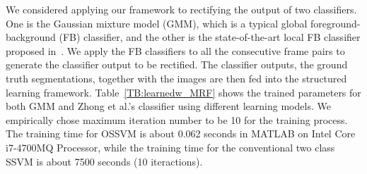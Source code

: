 \documentclass[10pt,journal,compsoc]{newIEEEtran}
\begin{document}
We considered applying our framework to rectifying the output of two classifiers. One is the Gaussian mixture model (GMM), which is a typical global foreground-background (FB) classifier, and the other is the state-of-the-art local FB classifier proposed in~\cite{Zhong2012UDC_SIGGRAPHAsia}. We apply the FB classifiers to all the consecutive frame pairs to generate the classifier output to be rectified. The classifier outputs, the ground truth segmentations, together with the images are then fed into the structured learning framework. Table~\ref{TB:learnedw_MRF} shows the trained parameters for both GMM and Zhong et al.'s classifier using different learning models. We empirically chose maximum iteration number to be 10 for the training process. The training time for OSSVM is about 0.062 seconds in MATLAB on Intel Core i7-4700MQ Processor, while the training time for the conventional two class SSVM is about 7500 seconds (10 iteractions).
\end{document}
